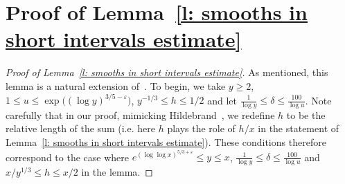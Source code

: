 \documentclass[12pt,a4paper,reqno]{amsart}
\numberwithin{equation}{section}
\def\leq {\leqslant}
\theoremstyle{remark}
\theoremstyle{definition}
\numberwithin{equation}{section}
\theoremstyle{remark}
\begin{document}
\appendix
\section{Proof of Lemma~\ref{l: smooths in short intervals estimate}}\label{s:appendix}

\begin{proof}[Proof of Lemma~\ref{l: smooths in short intervals estimate}]
As mentioned, this lemma is a natural extension of~\cite[Theorem~3]{Hildebrand}. To begin, we take $y \geq 2$, $1 \leq u \leq \exp \bigl( (\log y)^{3/5 - \varepsilon} \bigr)$, $y^{-1/3} \leq h \leq 1/2$ and let $\frac{1}{\log y} \leq \delta \leq \frac{100}{\log u}$. Note carefully that in our proof,  mimicking Hildebrand~\cite{Hildebrand}, we redefine $h$ to be the relative length of the sum (i.e. here $h$ plays the role of $h/x$ in the statement of Lemma~\ref{l: smooths in short intervals estimate}). These conditions therefore correspond to the case where $e^{(\log \log x)^{5/3 + \varepsilon}} \leq y \leq x$, $\frac{1}{\log y} \leq \delta \leq \frac{100}{\log u}$ and $x/y^{1/3} \leq h \leq x/2$ in the lemma.


\end{proof}
\end{document}

